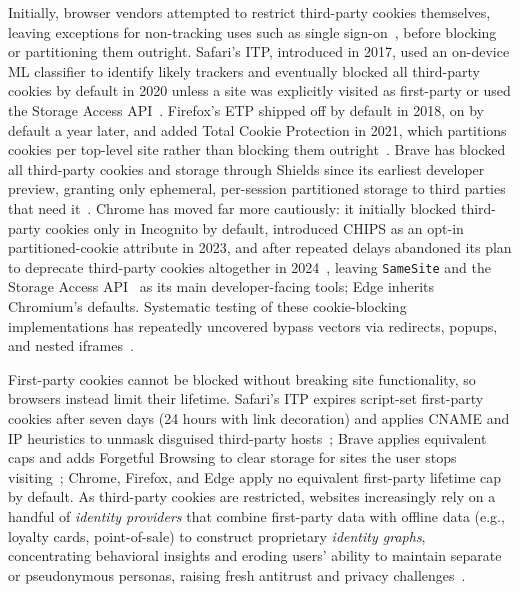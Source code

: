 %
Initially, browser vendors attempted to restrict third-party cookies themselves, leaving exceptions for non-tracking uses such as single sign-on~\cite{crouchImprovingPrivacyBreaking2018}, before blocking or partitioning them outright.
%
Safari's ITP, introduced in 2017, used an on-device ML classifier to identify likely trackers and eventually blocked all third-party cookies by default in 2020 unless a site was explicitly visited as first-party or used the Storage Access API~\cite{TrackingPreventionWebKit2020}.
%
Firefox's ETP shipped off by default in 2018, on by default a year later, and added Total Cookie Protection in 2021, which partitions cookies per top-level site rather than blocking them outright~\cite{mdnThirdpartyCookiesPrivacy2024}.
%
Brave has blocked all third-party cookies and storage through Shields since its earliest developer preview, granting only ephemeral, per-session partitioned storage to third parties that need it~\cite{braveprivacyteamEphemeralThirdpartySite2021}.
%
Chrome has moved far more cautiously: it initially blocked third-party cookies only in Incognito by default, introduced CHIPS as an opt-in partitioned-cookie attribute in 2023, and after repeated delays abandoned its plan to deprecate third-party cookies altogether in 2024~\cite{chavezNewPathPrivacy2024}, leaving \texttt{SameSite} and the Storage Access API~\cite{mdnStorageAccessAPI2024} as its main developer-facing tools; Edge inherits Chromium's defaults.
%
Systematic testing of these cookie-blocking implementations has repeatedly uncovered bypass vectors via redirects, popups, and nested iframes~\cite{frankenWhoLeftOpen2018}.


%
First-party cookies cannot be blocked without breaking site functionality, so browsers instead limit their lifetime.
%
Safari's ITP expires script-set first-party cookies after seven days (24 hours with link decoration) and applies CNAME and IP heuristics to unmask disguised third-party hosts~\cite{TrackingPreventionWebKit2020}; Brave applies equivalent caps and adds Forgetful Browsing to clear storage for sites the user stops visiting~\cite{bravePrivacyProtectionSecurity}; Chrome, Firefox, and Edge apply no equivalent first-party lifetime cap by default.
%
As third-party cookies are restricted, websites increasingly rely on a handful of \emph{identity providers} that combine first-party data with offline data (e.g., loyalty cards, point-of-sale) to construct proprietary \emph{identity graphs}, concentrating behavioral insights and eroding users' ability to maintain separate or pseudonymous personas, raising fresh antitrust and privacy challenges~\cite{TargetedAdvertisingAutorite2025,khanAmazonsAntitrustParadox2017,munirGooglesChromeAntitrust2024}.

